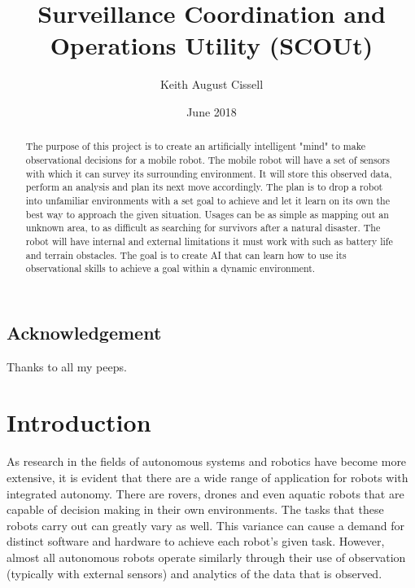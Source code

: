 \documentclass[]{report}
\begin{document}
\title{Surveillance Coordination and Operations Utility (SCOUt)}
\author{Keith August Cissell}
\date{June 2018}

\maketitle

\begin{abstract}
  The purpose of this project is to create an artificially intelligent "mind" to make observational decisions for a mobile robot.
  The mobile robot will have a set of sensors with which it can survey its surrounding environment. It will store this observed data, perform an analysis and plan its next move accordingly.
  The plan is to drop a robot into unfamiliar environments with a set goal to achieve and let it learn on its own the best way to approach the given situation.
  Usages can be as simple as mapping out an unknown area, to as difficult as searching for survivors after a natural disaster.
  The robot will have internal and external limitations it must work with such as battery life and terrain obstacles.
  The goal is to create AI that can learn how to use its observational skills to achieve a goal within a dynamic environment.
\end{abstract}

\section*{Acknowledgement}
Thanks to all my peeps.

\tableofcontents
\newpage



\chapter{Introduction}
As research in the fields of autonomous systems and robotics have become more extensive, it is evident that there are a wide range of application for robots with integrated autonomy.
There are rovers, drones and even aquatic robots that are capable of decision making in their own environments.
The tasks that these robots carry out can greatly vary as well.
This variance can cause a demand for distinct software and hardware to achieve each robot’s given task.
However, almost all autonomous robots operate similarly through their use of observation (typically with external sensors) and analytics of the data that is observed.
\end{document}
